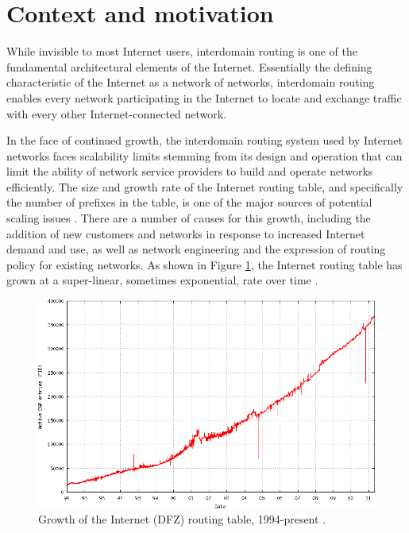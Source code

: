 \section{Context and motivation}

While invisible to most Internet users, interdomain routing is one of the
fundamental architectural elements of the Internet. Essentially the defining
characteristic of the Internet as a network of networks, interdomain routing
enables every network participating in the Internet to locate and exchange
traffic with every other Internet-connected network.

In the face of continued growth, the interdomain routing system used by
Internet networks faces scalability limits stemming from its design and
operation that can limit the ability of network service providers to build and
operate networks efficiently. The size and growth rate of the Internet routing
table, and specifically the number of prefixes in the table, is one of the
major sources of potential scaling issues \cite{rfc4984}. There are a number of
causes for this growth, including the addition of new customers and networks in
response to increased Internet demand and use, as well as network engineering
and the expression of routing policy for existing networks. As shown in Figure
\ref{fig:huston_table_plot}, the Internet routing table has grown at a
super-linear, sometimes exponential, rate over time \cite{Huston:2001bs}.

\begin{figure}[h]
\begin{center}
    \includegraphics[width=4.5in]{static_figures/huston_table_plot.png}
    \caption[Size of the Internet (DFZ) routing table, 1994-present]
    {Growth of the Internet (DFZ) routing table, 1994-present
    \cite{6447-table-report}.}
    \label{fig:huston_table_plot}
\end{center}
\end{figure}

